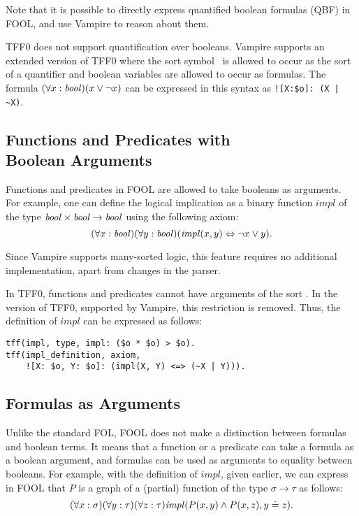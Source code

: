 Note that it is possible to directly express quantified boolean formulas (QBF) in FOOL, and use Vampire to reason about them.

TFF0 does not support quantification over booleans. Vampire supports an extended version of TFF0 where the sort symbol \tptpo\ is allowed to occur as the sort of a quantifier and boolean variables are allowed to occur as formulas. The formula $(\forall x:\mathit{bool})(x \lor \neg x)$ can be expressed in this syntax as \lstinline[language=tptp]{![X:$o]: (X | ~X)}. %

\subsection[Functions and Predicates with Boolean Arguments]{Functions and Predicates with\\Boolean Arguments}

Functions and predicates in FOOL are allowed to take booleans as arguments. For example, one can define the logical implication as a binary function $\mathit{impl}$ of the type $\mathit{bool} \times \mathit{bool} \to \mathit{bool}$ using the following axiom:
\[
  (\forall x: \mathit{bool})(\forall y: \mathit{bool})(\mathit{impl}(x, y) \Leftrightarrow \neg x \lor y).
\]

Since Vampire supports many-sorted logic, this feature requires no additional implementation, apart from changes in the parser.

In TFF0, functions and predicates cannot have arguments of the sort \tptpo. In the version of TFF0, supported by Vampire, this restriction is removed. Thus, the definition of $\mathit{impl}$ can be expressed as follows:
\begin{lstlisting}[language=tptp]
tff(impl, type, impl: ($o * $o) > $o).
tff(impl_definition, axiom,
    ![X: $o, Y: $o]: (impl(X, Y) <=> (~X | Y))).
\end{lstlisting}%

\subsection{Formulas as Arguments}

Unlike the standard FOL, FOOL does not make a distinction between formulas and boolean terms. It means that a function or a predicate can take a formula as a boolean argument, and formulas can be used as arguments to equality between booleans. For example, with the definition of $\mathit{impl}$, given earlier, we can express in FOOL that
$P$ is a graph of a (partial) function of the type $\sigma \to \tau$ as follows:
\begin{equation}\label{eq:bool-arg-example}
  (\forall x:\sigma)(\forall y:\tau)(\forall z:\tau)\mathit{impl}(P(x,y) \land P(x,z), y \doteq z).
\end{equation}

